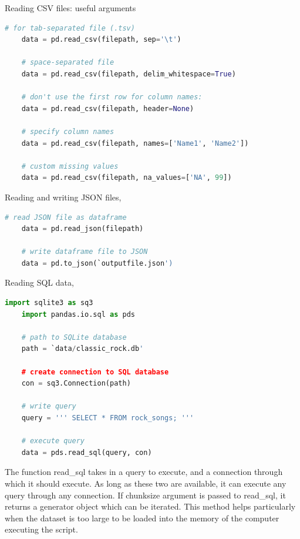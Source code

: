 \documentclass{article}
\theoremstyle{mytheoremstyle}
\theoremstyle{mytheoremstyle}
\theoremstyle{myproblemstyle}
\begin{document}
    \noindent Reading CSV files: useful arguments
    \begin{lstlisting}[language=Python]
    # for tab-separated file (.tsv)
    data = pd.read_csv(filepath, sep='\t')

    # space-separated file
    data = pd.read_csv(filepath, delim_whitespace=True)

    # don't use the first row for column names:
    data = pd.read_csv(filepath, header=None)

    # specify column names
    data = pd.read_csv(filepath, names=['Name1', 'Name2'])

    # custom missing values
    data = pd.read_csv(filepath, na_values=['NA', 99])
    \end{lstlisting}

    \vspace{1cm}

    \noindent Reading and writing JSON files,
    \begin{lstlisting}[language=Python]
    # read JSON file as dataframe
    data = pd.read_json(filepath)

    # write dataframe file to JSON
    data = pd.to_json(`outputfile.json')
    \end{lstlisting}

    \vspace{1cm}

    \noindent Reading SQL data,
    \begin{lstlisting}[language=Python]
    import sqlite3 as sq3
    import pandas.io.sql as pds

    # path to SQLite database
    path = `data/classic_rock.db'

    # create connection to SQL database
    con = sq3.Connection(path)

    # write query
    query = ''' SELECT * FROM rock_songs; '''

    # execute query
    data = pds.read_sql(query, con)
    \end{lstlisting}

    \vspace{1cm}

    \noindent The function read\_sql takes in a query to execute, and a
    connection through which it should execute. As long as these two
    are available, it can execute any query through any connection. If
    chunksize argument is passed to read\_sql, it returns a generator
    object which can be iterated. This method helps particularly when the
    dataset is too large to be loaded into the memory of the computer executing
    the script.
\end{document}
